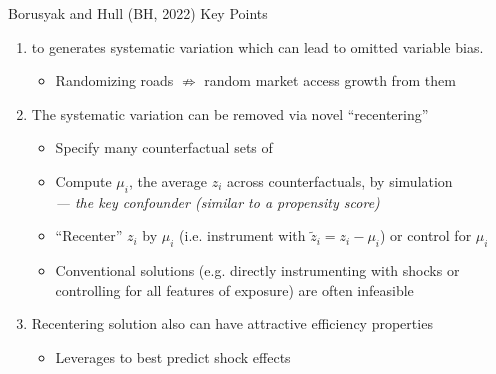 \documentclass{beamer}
\begin{document}
\begin{frame}{Borusyak and Hull (BH, 2022) Key Points}
  
  {\small 
  \vspace{-3mm}
	\begin{enumerate}

	\item {} to  generates systematic variation which can lead to omitted variable bias. \pause 
  
  \vspace{-2mm}
  \begin{itemize}
    \item Randomizing roads $\not\Rightarrow$ random market access growth from them\pause 
  \end{itemize}

	\item The systematic variation can be removed via novel ``recentering''\pause 

    \vspace{-2mm}
		\begin{itemize}
		\item Specify many counterfactual sets of  
    
    \pause 
		\item Compute $\mu_i$, the average $z_i$ across counterfactuals, by simulation \\ \pause\emph{--- the key confounder (similar to a propensity score)}
    
    \pause 
		\item ``Recenter'' $z_i$ by $\mu_i$ (i.e. instrument with $\tilde{z}_i=z_i-\mu_i$) or control for $\mu_i$ 
    
    \pause 
		\item Conventional solutions (e.g. directly instrumenting with shocks or controlling for all features of exposure) are often infeasible 		
		\end{itemize}

  \pause 
	\item Recentering solution also can have attractive efficiency properties
    \vspace{-2mm}
    \begin{itemize}
	  	\item Leverages  to best predict shock effects
		\end{itemize}
	\end{enumerate}
  }
\end{frame}
\end{document}
